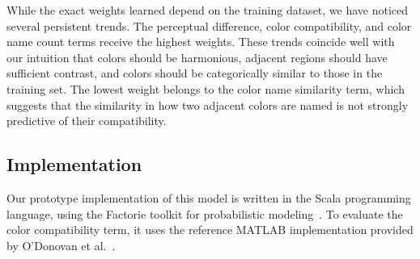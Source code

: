 While the exact weights learned depend on the training dataset, we have noticed several persistent trends.
The perceptual difference, color compatibility, and color name count terms receive the highest weights. These trends coincide well with our intuition that colors should be harmonious, adjacent regions should have sufficient contrast, and colors should be categorically similar to those in the training set.
The lowest weight belongs to the color name similarity term, which suggests that the similarity in how two adjacent colors are named is not strongly predictive of their compatibility.

\subsection{Implementation}
\label{sec:implementation}

Our prototype implementation of this model is written in the Scala programming language, using the Factorie toolkit for probabilistic modeling~\cite{Factorie}. To evaluate the color compatibility term, it uses the reference MATLAB implementation provided by O'Donovan et al.~.
